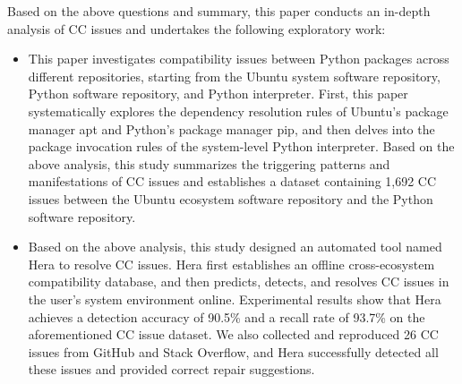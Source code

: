 \begin{eabstract}
Based on the above questions and summary, this paper conducts an in-depth analysis of CC issues and undertakes the following exploratory work:
\begin{itemize}
	\item This paper investigates compatibility issues between Python packages across different repositories, starting from the Ubuntu system software repository, Python software repository, and Python interpreter.
	First, this paper systematically explores the dependency resolution rules of Ubuntu's package manager apt and Python's package manager pip, and then delves into the package invocation rules of the system-level Python interpreter.
	Based on the above analysis, this study summarizes the triggering patterns and manifestations of CC issues and establishes a dataset containing 1,692 CC issues between the Ubuntu ecosystem software repository and the Python software repository.
	\item Based on the above analysis, this study designed an automated tool named Hera to resolve CC issues.
	Hera first establishes an offline cross-ecosystem compatibility database, and then predicts, detects, and resolves CC issues in the user's system environment online.
	Experimental results show that Hera achieves a detection accuracy of 90.5\% and a recall rate of 93.7\% on the aforementioned CC issue dataset.
	We also collected and reproduced 26 CC issues from GitHub and Stack Overflow, and Hera successfully detected all these issues and provided correct repair suggestions.
\end{itemize}


\end{eabstract}


